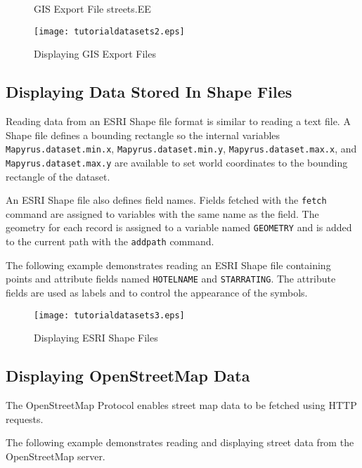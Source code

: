 \begin{figure}[htb]

\caption{GIS Export File streets.EE}
\label{streetsEE}
\end{figure}



\begin{figure}[htb]
\texttt{[image: tutorialdatasets2.eps]}
\caption{Displaying GIS Export Files}
\label{tutorialdatasets2}
\end{figure}

\subsection{Displaying Data Stored In Shape Files}

Reading data from an ESRI Shape file format is similar to reading a text file.
A Shape file defines a bounding rectangle so the internal variables
\texttt{Mapyrus.dataset.min.x}, \texttt{Mapyrus.dataset.min.y},
\texttt{Mapyrus.dataset.max.x}, and \texttt{Mapyrus.dataset.max.y} are
available to set world coordinates to the bounding rectangle of the dataset.

An ESRI Shape file also defines field names.  Fields fetched with the
\texttt{fetch} command are assigned to variables with the same name as the
field.  The geometry for each record is assigned to a variable named
\texttt{GEOMETRY} and is added to the current path with the \texttt{addpath}
command.

The following example demonstrates reading an ESRI Shape file containing points
and attribute fields named \texttt{HOTELNAME} and \texttt{STARRATING}.  The
attribute fields are used as labels and to control the appearance of the
symbols.



\begin{figure}[htb]
\texttt{[image: tutorialdatasets3.eps]}
\caption{Displaying ESRI Shape Files}
\label{tutorialdatasets3}
\end{figure}

\subsection{Displaying OpenStreetMap Data}

The OpenStreetMap Protocol enables street map data to be fetched
using HTTP requests.

The following example demonstrates reading and displaying
street data from the OpenStreetMap server.

